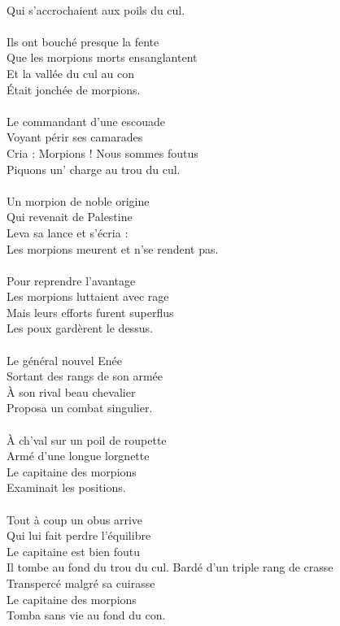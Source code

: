 \\Qui s'accrochaient aux poils du cul.
\\\\Ils ont bouché presque la fente
\\Que les morpions morts ensanglantent
\\Et la vallée du cul au con
\\Était jonchée de morpions.
\\\\Le commandant d'une escouade
\\Voyant périr ses camarades
\\Cria : Morpions ! Nous sommes foutus
\\Piquons un' charge au trou du cul.
\\\\Un morpion de noble origine
\\Qui revenait de Palestine
\\Leva sa lance et s'écria :
\\Les morpions meurent et n'se rendent pas.
\\\\Pour reprendre l'avantage
\\Les morpions luttaient avec rage
\\Mais leurs efforts furent superflus
\\Les poux gardèrent le dessus.
\\\\Le général nouvel Enée
\\Sortant des rangs de son armée
\\À son rival beau chevalier
\\Proposa un combat singulier.
\\\\À ch'val sur un poil de roupette
\\Armé d'une longue lorgnette
\\Le capitaine des morpions
\\Examinait les positions.
\\\\Tout à coup un obus arrive
\\Qui lui fait perdre l'équilibre
\\Le capitaine est bien foutu
\\Il tombe au fond du trou du cul.
\breakpage
Bardé d'un triple rang de crasse
\\Transpercé malgré sa cuirasse
\\Le capitaine des morpions
\\Tomba sans vie au fond du con.
